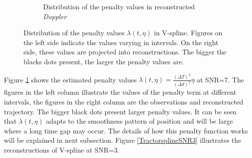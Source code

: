 \begin{figure}
\begin{subfigure}{\textwidth}
    \caption{Distribution of the penalty values in reconstructed \textit{Doppler}}
    \end{subfigure}
\caption{Distribution of the penalty values $\lambda(t,\eta)$ in V-spline. Figures on the left side indicate the values varying in intervals. On the right side, these values are projected into reconstructions. The bigger the blacks dots present, the larger the penalty values are.}\label{numpenalty}
\end{figure}


Figure \ref{numpenalty} shows the estimated penalty values $\lambda(t,\eta)=\frac{\left(\Delta T\right)^3}{\left(\Delta d\right)^2}\eta$ at SNR=7. The figures in the left column illustrate the values of the penalty term at different intervals, the figures in the right column are the observations and reconstructed trajectory. The bigger black dots present larger penalty values. It can be seen that $\lambda(t,\eta)$ adapts to the smoothness pattern of position and will be large where a long time gap may occur. The details of how this penalty function works will be explained in next subsection. Figure \ref{TractorsplineSNR3} illustrates the reconstructions of V-spline at SNR=3.



